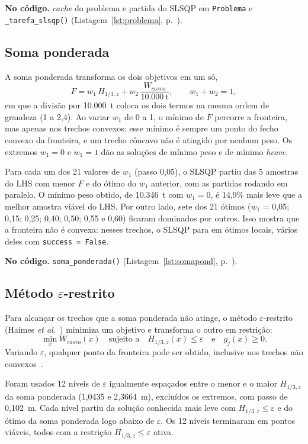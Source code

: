 \documentclass[11pt,a4paper]{article}
\newcommand{\notacodigo}[1]{\begin{nocodigo}\textbf{\sffamily\color{azul}No código.} #1\end{nocodigo}}
\newcommand{\lst}[1]{Listagem~\ref{lst:#1}, p.~\pageref{lst:#1}}
\newcommand{\Hz}{H_{1/3,z}}
\newcommand{\Wc}{W_{casco}}
\begin{document}
\notacodigo{\emph{cache} do problema e partida do SLSQP em \texttt{Problema} e
\texttt{\_tarefa\_slsqp()} (\lst{problema}).}

\subsection{Soma ponderada}

A soma ponderada transforma os dois objetivos em um só,
\begin{equation}
F = w_1\, \Hz + w_2\, \frac{\Wc}{10.000~\text{t}}, \qquad w_1 + w_2 = 1 ,
\end{equation}
em que a divisão por 10.000~t coloca os dois termos na mesma ordem de grandeza (1 a 2,4). Ao variar
$w_1$ de 0 a 1, o mínimo de $F$ percorre a fronteira, mas apenas nos trechos convexos: esse mínimo é
sempre um ponto do fecho convexo da fronteira, e um trecho côncavo não é atingido por nenhum peso.
Os extremos $w_1 = 0$ e $w_1 = 1$ dão as soluções de mínimo peso e de mínimo \emph{heave}.

Para cada um dos 21 valores de $w_1$ (passo 0,05), o SLSQP partiu das 5 amostras do LHS com menor
$F$ e do ótimo do $w_1$ anterior, com as partidas rodando em paralelo. O mínimo peso obtido, de
10.346~t com $w_1 = 0$, é 14,9\% mais leve que a melhor amostra viável do LHS. Por outro lado,
sete dos 21 ótimos ($w_1$ = 0,05; 0,15; 0,25; 0,40; 0,50; 0,55 e 0,60) ficaram dominados por
outros. Isso mostra que a fronteira não é convexa: nesses trechos, o SLSQP para em ótimos locais,
vários deles com \texttt{success = False}.

\notacodigo{\texttt{soma\_ponderada()} (\lst{somapond}).}

\subsection{Método $\varepsilon$-restrito}

Para alcançar os trechos que a soma ponderada não atinge, o método $\varepsilon$-restrito (Haimes
\emph{et al.}~\cite{haimes}) minimiza um objetivo e transforma o outro em restrição:
\begin{equation}
\min_x \Wc(x) \quad \text{sujeito a} \quad \Hz(x) \le \varepsilon \quad \text{e} \quad g_j(x) \ge 0 .
\end{equation}
Variando $\varepsilon$, qualquer ponto da fronteira pode ser obtido, inclusive nos trechos não
convexos~\cite{miettinen}.

Foram usados 12 níveis de $\varepsilon$ igualmente espaçados entre o menor e o maior $\Hz$ da soma
ponderada (1,0435 e 2,3664~m), excluídos os extremos, com passo de 0,102~m. Cada nível partiu da
solução conhecida mais leve com $\Hz \le \varepsilon$ e do ótimo da soma ponderada logo abaixo de
$\varepsilon$. Os 12 níveis terminaram em pontos viáveis, todos com a restrição
$\Hz \le \varepsilon$ ativa.
\end{document}
